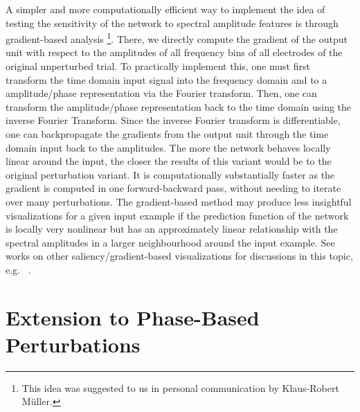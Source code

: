     A simpler and more computationally efficient way to implement the idea
of testing the sensitivity of the network to spectral amplitude features
is through gradient-based analysis \footnote{This idea was suggested to
  us in personal communication by Klaus-Robert Müller.}. There, we
directly compute the gradient of the output unit with respect to the
amplitudes of all frequency bins of all electrodes of the original
unperturbed trial. To practically implement this, one must first
transform the time domain input signal into the frequency domain and to
a amplitude/phase representation via the Fourier transform. Then, one
can transform the amplitude/phase representation back to the time domain
using the inverse Fourier Transform. Since the inverse Fourier transform
is differentiable, one can backpropagate the gradients from the output
unit through the time domain input back to the amplitudes. The more the
network behaves locally linear around the input, the closer the results
of this variant would be to the original perturbation variant. It is
computationally substantially faster as the gradient is computed in one
forward-backward pass, without needing to iterate over many
perturbations. The gradient-based method may produce less insightful
visualizations for a given input example if the prediction function of the network is locally very nonlinear but has an approximately linear relationship
with the spectral amplitudes in a larger neighbourhood around the input example. See works on other saliency/gradient-based visualizations for
discussions in this topic,
e.g. ~\citet{sturmfels2020visualizing}.


\section{Extension to Phase-Based
Perturbations}\label{extension-to-phase-based-perturbations}

